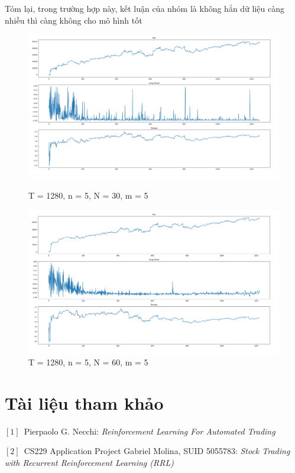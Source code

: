 \documentclass[14pt]{extreport}
\begin{document}
Tóm lại, trong trường hợp này, kết luận của nhóm là không hẳn dữ liệu càng nhiều thì càng không cho mô hình tốt
\begin{center}
    \begin{figure}[htp]
    \begin{center}
     \includegraphics[scale=.4]{result_1-1}
    \end{center}
    \caption{T = 1280, n = 5, N = 30, m = 5}
    \begin{center}
     \includegraphics[scale=.4]{result_2-1}
    \end{center}
    \caption{T = 1280, n = 5, N = 60, m = 5}
    \end{figure}
\end{center} 

\chapter*{Tài liệu tham khảo}
\begin{flushleft}

\quad $[1]$\ Pierpaolo G. Necchi: \textit{ Reinforcement Learning For Automated Trading}

\quad $[2]$\ CS229 Application Project
Gabriel Molina, SUID 5055783: \textit{ Stock Trading with Recurrent Reinforcement
Learning (RRL)}
\end{flushleft}
\end{document}

